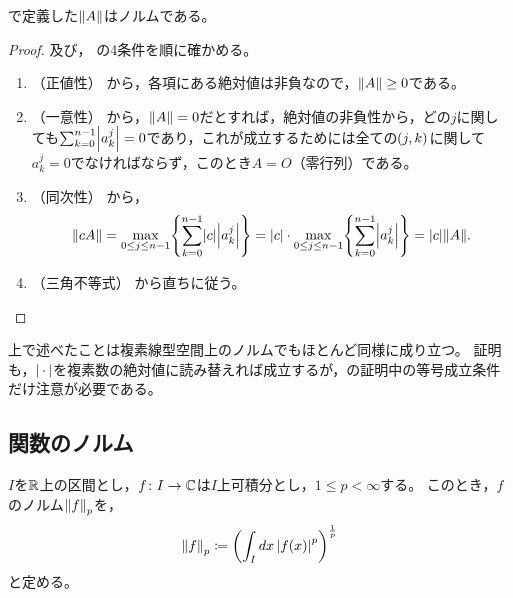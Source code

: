 \documentclass[b5paper,draft]{ltjsbook}
\begin{document}
\begin{prop}
    で定義した$\norm{A}$はノルムである。
    \begin{proof}
        及び，
        の4条件を順に確かめる。
        \begin{enumerate}[label=(\roman*)]
            \item （正値性）
            から，各項にある絶対値は非負なので，$\norm{A} \geq 0$である。

            \item （一意性）
            から，$\norm{A}=0$だとすれば，絶対値の非負性から，どの$j$に関しても$\sum_{k=0}^{n-1}\abs{a^j_k}=0$であり，これが成立するためには全ての$\pare{j,k}$に関して$a^j_k=0$でなければならず，このとき$A=O$（零行列）である。

            \item （同次性）
            から，
            \begin{equation}
                \norm{cA}=\max_{0\leq j\leq n-1} \bra{\sum_{k=0}^{n-1} \abs{c}\abs{a^j_k}}=\abs{c}\cdot \max_{0\leq j\leq n-1} \bra{\sum_{k=0}^{n-1} \abs{a^j_k}}=\abs{c}\norm{A}.
            \end{equation}

            \item （三角不等式）
            から直ちに従う。
        \end{enumerate}
    \end{proof}
\end{prop}

\begin{rem}
    上で述べたことは複素線型空間上のノルムでもほとんど同様に成り立つ。
    証明も，$\abs{\dummy}$を複素数の絶対値に読み替えれば成立するが，の証明中の等号成立条件だけ注意が必要である。
\end{rem}


\subsection{関数のノルム}
\begin{defi}[$L^p$ノルム]
    $I$を$\mathbb{R}$上の区間とし，$f\colon I\to \mathbb{C}$は$I$上可積分とし，$1\leq p <\infty$する。
    このとき，$f$のノルム$\norm{f}_p$を，
    \begin{equation}
        \norm{f}_p \coloneqq \pare{\int_I dx\, \abs{\fun{f}{x}}^p}^{\frac{1}{p}}
    \end{equation}
    と定める。
\end{defi}
\end{document}
